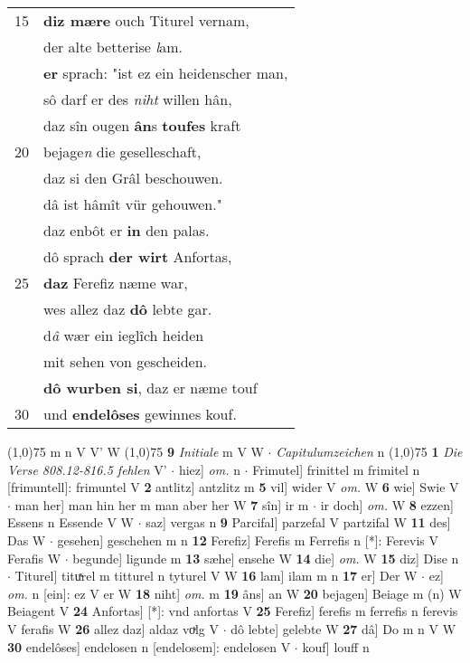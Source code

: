 \documentclass[8pt,a4paper,notitlepage]{article}
\begin{document}
\begin{table}[ht]
\begin{minipage}[t]{0.5\linewidth}
\begin{tabular}{rl}
15 & \textbf{diz mære} ouch Titurel vernam,\\ 
 & der alte betterise \textit{l}am.\\ 
 & \textbf{er} sprach: "ist ez ein heidenscher man,\\ 
 & sô darf er des \textit{niht} willen hân,\\ 
 & daz sîn ougen \textbf{ân}s \textbf{toufes} kraft\\ 
20 & bejage\textit{n} die geselleschaft,\\ 
 & daz si den Grâl beschouwen.\\ 
 & dâ ist hâmît vür gehouwen."\\ 
 & daz enbôt er \textbf{in} den palas.\\ 
 & dô sprach \textbf{der wirt} Anfortas,\\ 
25 & \textbf{daz} Ferefiz næme war,\\ 
 & wes allez daz \textbf{dô} lebte gar.\\ 
 & d\textit{â} wær ein ieglîch heiden\\ 
 & mit sehen von gescheiden.\\ 
 & \textbf{dô wurben si}, daz er næme touf\\ 
30 & und \textbf{endelôses} gewinnes kouf.\\ 
\end{tabular}
\scriptsize
\line(1,0){75} \newline
m n V V' W \newline
\line(1,0){75} \newline
\textbf{9} \textit{Initiale} m V W   $\cdot$ \textit{Capitulumzeichen} n  \newline
\line(1,0){75} \newline
\textbf{1} \textit{Die Verse 808.12-816.5 fehlen} V'   $\cdot$ hiez] \textit{om.} n  $\cdot$ Frimutel] frinittel m frimitel n [frimuntell]: frimuntel V \textbf{2} antlitz] antzlitz m \textbf{5} vil] wider V \textit{om.} W \textbf{6} wie] Swie V  $\cdot$ man her] man hin her m man aber her W \textbf{7} sîn] ir m  $\cdot$ ir doch] \textit{om.} W \textbf{8} ezzen] Essens n Essende V W  $\cdot$ saz] vergas n \textbf{9} Parcifal] parzefal V partzifal W \textbf{11} des] Das W  $\cdot$ gesehen] geschehen m n \textbf{12} Ferefiz] Ferefis m Ferrefis n [*]: Ferevis V Ferafis W  $\cdot$ begunde] ligunde m \textbf{13} sæhe] ensehe W \textbf{14} die] \textit{om.} W \textbf{15} diz] Dise n  $\cdot$ Titurel] tituͯrel m titturel n tyturel V W \textbf{16} lam] ilam m n \textbf{17} er] Der W  $\cdot$ ez] \textit{om.} n [ein]: ez V er W \textbf{18} niht] \textit{om.} m \textbf{19} âns] an W \textbf{20} bejagen] Beiage m (n) W Beiagent V \textbf{24} Anfortas] [*]: vnd anfortas V \textbf{25} Ferefiz] ferefis m ferrefis n ferevis V ferafis W \textbf{26} allez daz] aldaz voͮlg V  $\cdot$ dô lebte] gelebte W \textbf{27} dâ] Do m n V W \textbf{30} endelôses] endelosen n [endelosem]: endelosen V  $\cdot$ kouf] louff n \newline
\end{minipage}
\end{table}
\end{document}
